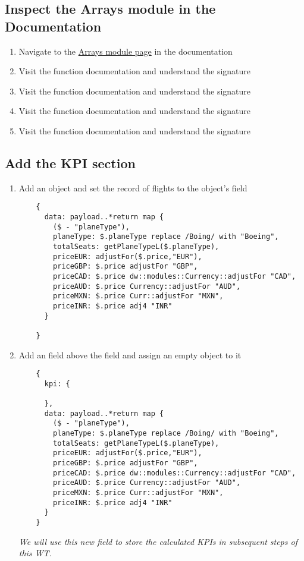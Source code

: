 \subsection{Inspect the Arrays module in the Documentation}
\begin{enumerate}
\item Navigate to the \href{https://docs.mulesoft.com/mule-runtime/4.3/dw-arrays}{Arrays module page} in the documentation
\item Visit the  function documentation and understand the signature
\item Visit the  function documentation and understand the signature
\item Visit the  function documentation and understand the signature
\item Visit the  function documentation and understand the signature
\end{enumerate}

\subsection{Add the KPI section}
\begin{enumerate}[resume*]
\item Add an object and set the record of flights to the object's  field
  \begin{verbatim}
    {
      data: payload..*return map {
        ($ - "planeType"),
        planeType: $.planeType replace /Boing/ with "Boeing",
        totalSeats: getPlaneTypeL($.planeType),
        priceEUR: adjustFor($.price,"EUR"),
        priceGBP: $.price adjustFor "GBP",
        priceCAD: $.price dw::modules::Currency::adjustFor "CAD",
        priceAUD: $.price Currency::adjustFor "AUD",
        priceMXN: $.price Curr::adjustFor "MXN",
        priceINR: $.price adj4 "INR"
      }
      
    }
  \end{verbatim}
\item Add an  field above the  field and assign an empty object to it
  \begin{verbatim}
    {
      kpi: {
        
      },
      data: payload..*return map {
        ($ - "planeType"),
        planeType: $.planeType replace /Boing/ with "Boeing",
        totalSeats: getPlaneTypeL($.planeType),
        priceEUR: adjustFor($.price,"EUR"),
        priceGBP: $.price adjustFor "GBP",
        priceCAD: $.price dw::modules::Currency::adjustFor "CAD",
        priceAUD: $.price Currency::adjustFor "AUD",
        priceMXN: $.price Curr::adjustFor "MXN",
        priceINR: $.price adj4 "INR"
      }
    }
  \end{verbatim}
  \emph{
    We will use this new field to store the calculated KPIs in subsequent steps of this WT.
  }
\end{enumerate}

